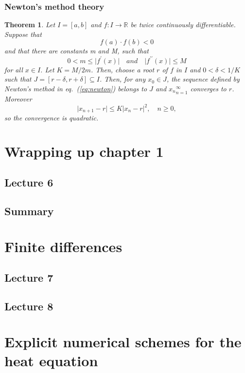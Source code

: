 \documentclass{article}
\newtheorem{theorem}{Theorem}
\begin{document}
\subsubsection{Newton's method theory}
\begin{theorem}
    Let $I=[a,b]$ and $f:I\to\mathbb{R}$ be twice continuously differentiable. Suppose that
    \begin{equation}
        f(a)\cdot f(b)<0 \nonumber
    \end{equation}
    and that there are constants m and M, such that
    \begin{equation}
        0<m\leq \vert f^\prime(x)\vert\quad and \quad \vert f^{\prime\prime}(x)\vert \leq M
    \end{equation}
    for all $x\in I$. Let $K=M/2m$. Then, choose a root $r$ of $f$ in $I$ and $0<\delta<1/K$ such that $J=[r-\delta,r+\delta]\subseteq I$. Then, for any $x_0\in J$, the sequence defined by Newton's method in eq.~(\ref{eq:newton}) belongs to $J$ and ${x_n}_{n=1}^\infty$ converges to $r$. Moreover
    \begin{equation}
        \vert x_{n+1}-r\vert \leq K\vert x_n-r\vert^2,\quad n\geq0,
    \end{equation}
    so the convergence is quadratic.
\end{theorem}


\section{Wrapping up chapter 1}
\subsection{Lecture 6}
\subsection{Summary}


\section{Finite differences}
\subsection{Lecture 7}
\subsection{Lecture 8}


\section{Explicit numerical schemes for the heat equation}
\end{document}

